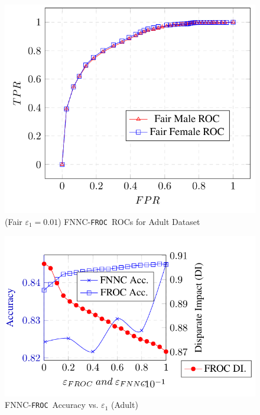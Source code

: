 \documentclass{article}
\newcommand{\ouralgo}{\texttt{FROC}}
\begin{document}
\begin{figure}[!h]
    \centering
    \includegraphics[width=1\linewidth]{Images/FNNC_Adult_Baseline_ROC_FROC.png}
    \caption{(Fair $\varepsilon_1 = 0.01$) FNNC-\ouralgo\   ROCs for Adult Dataset}
    \label{fig:FNNC_Adult_ROC_FROC}
\end{figure}

\begin{figure}[!h]
    \centering
    \includegraphics[width=1\linewidth]{Images/FNNC_Adult_Acc_DI.png}
    \caption{FNNC-\ouralgo\  Accuracy vs. $\varepsilon_1$ (Adult)}
    \label{fig:FNNC_Adult_Accuracy}
\end{figure}

\end{document}
